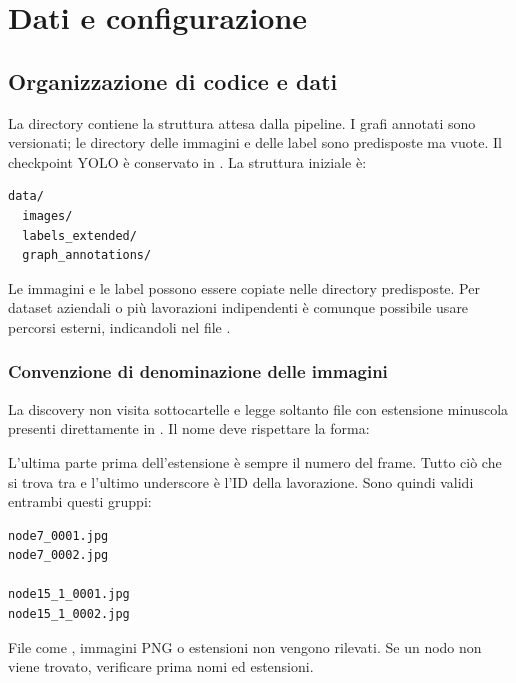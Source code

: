 \chapter{Dati e configurazione}
\label{chap:dati}

\section{Organizzazione di codice e dati}

La directory  contiene la struttura attesa dalla pipeline. I
grafi annotati sono versionati; le directory delle immagini e delle label sono
predisposte ma vuote. Il checkpoint YOLO è conservato in .
La struttura iniziale è:

\begin{lstlisting}[language={}]
data/
  images/
  labels_extended/
  graph_annotations/
\end{lstlisting}

Le immagini e le label possono essere copiate nelle directory predisposte. Per
dataset aziendali o più lavorazioni indipendenti è comunque possibile usare
percorsi esterni, indicandoli nel file .

\subsection{Convenzione di denominazione delle immagini}

La discovery non visita sottocartelle e legge soltanto file con estensione
minuscola  presenti direttamente in . Il nome
deve rispettare la forma:

\begin{center}
\end{center}

L'ultima parte prima dell'estensione è sempre il numero del frame. Tutto ciò che
si trova tra  e l'ultimo underscore è l'ID della lavorazione. Sono
quindi validi entrambi questi gruppi:

\begin{lstlisting}[language={}]
node7_0001.jpg
node7_0002.jpg

node15_1_0001.jpg
node15_1_0002.jpg
\end{lstlisting}

File come , immagini PNG o estensioni  non
vengono rilevati. Se un nodo non viene trovato, verificare prima nomi ed
estensioni.

